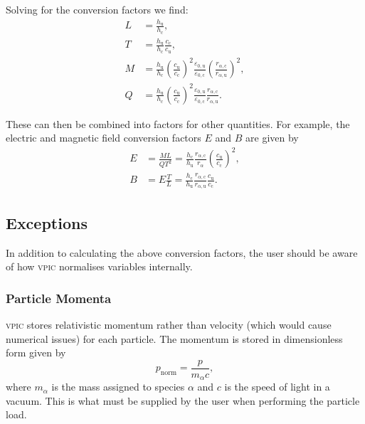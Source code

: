 \documentclass[twocolumn,10pt]{article}
\begin{document}
\noindent Solving for the conversion factors we find:
\begin{align}
	L &= \frac{h_{\mathrm{u}}}{h_{\mathrm{c}}}, \\
	T &= \frac{h_{\mathrm{u}}}{h_{\mathrm{c}}}\frac{c_{\mathrm{c}}}{c_{\mathrm{u}}}, \\
	M &= \frac{h_{\mathrm{u}}}{h_{\mathrm{c}}}\left(\frac{c_{\mathrm{u}}}{c_{\mathrm{c}}}\right)^2\frac{\varepsilon_{0,\mathrm{u}}}{\varepsilon_{0,\mathrm{c}}}\left(\frac{r_{\alpha,\mathrm{c}}}{r_{\alpha,\mathrm{u}}}\right)^2, \\
	Q &= \frac{h_{\mathrm{u}}}{h_{\mathrm{c}}}\left(\frac{c_{\mathrm{u}}}{c_{\mathrm{c}}}\right)^2\frac{\varepsilon_{0,\mathrm{u}}}{\varepsilon_{0,\mathrm{c}}}\frac{r_{\alpha,\mathrm{c}}}{r_{\alpha,\mathrm{u}}}.
\end{align}

\noindent These can then be combined into factors for other quantities.
For example, the electric and magnetic field conversion factors $E$ and $B$ are given by
\begin{align}
	E &= \frac{ML}{QT^2} = \frac{h_{\mathrm{c}}}{h_{\mathrm{u}}}\frac{r_{\alpha,\mathrm{c}}}{r_{\alpha}}\left(\frac{c_{\mathrm{u}}}{c_{\mathrm{c}}}\right)^2, \\
	B &= E\frac{T}{L} = \frac{h_{\mathrm{c}}}{h_{\mathrm{u}}}\frac{r_{\alpha,\mathrm{c}}}{r_{\alpha,\mathrm{u}}}\frac{c_{\mathrm{u}}}{c_{\mathrm{c}}}.
\end{align}



\subsection{Exceptions}

In addition to calculating the above conversion factors, the user should be aware of how \textsc{vpic} normalises variables internally.

\subsubsection{Particle Momenta}

\textsc{vpic} stores relativistic momentum rather than velocity (which would cause numerical issues) for each particle.
The momentum is stored in dimensionless form given by
\begin{equation}
    p_{\textrm{norm}} = \frac{p}{m_\alpha c},
\end{equation}
where $m_\alpha$ is the mass assigned to species $\alpha$ and $c$ is the speed of light in a vacuum.
This is what must be supplied by the user when performing the particle load.
\end{document}
